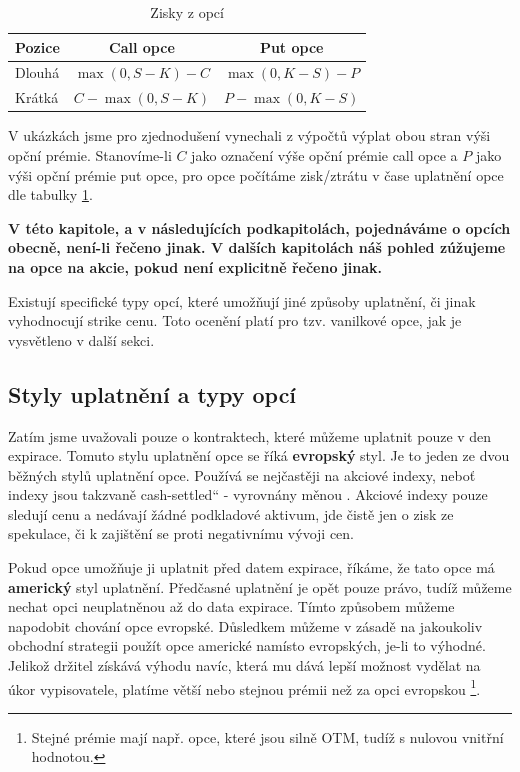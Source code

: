 \documentclass[male,czech,api_bc]{kitheses}
\newcommand{\UV}[1]{\quotedblbase#1\textquotedblleft}
\begin{document}
  \begin{table}[h]
    \centering
    \caption{Zisky z opcí}
    \label{tab:option_profits}
    \begin{tabular}{lcc}
      \toprule
      \textbf{Pozice} & \textbf{Call opce} & \textbf{Put opce} \\
      \midrule
      Dlouhá & $\max(0, S-K) - C$ & $\max(0, K-S) - P$ \\
      Krátká & $C - \max(0, S-K)$ & $P - \max(0, K-S)$ \\
      \bottomrule
    \end{tabular}
  \end{table}

  V ukázkách jsme pro zjednodušení vynechali z výpočtů výplat obou stran výši opční prémie. Stanovíme-li $C$ jako označení výše opční prémie call opce a $P$ jako výši opční prémie put opce, pro opce počítáme zisk/ztrátu v čase uplatnění opce dle tabulky \ref{tab:option_profits}.

  \textbf{V této kapitole, a v následujících podkapitolách, pojednáváme o opcích obecně, není-li řečeno jinak. V dalších kapitolách náš pohled zúžujeme na opce na akcie, pokud není explicitně řečeno jinak.}

  Existují specifické typy opcí, které umožňují jiné způsoby uplatnění, či jinak vyhodnocují strike cenu. Toto ocenění platí pro tzv. vanilkové opce, jak je vysvětleno v další sekci.

  \subsection{Styly uplatnění a typy opcí}

  \label{sec:option_types}

  Zatím jsme uvažovali pouze o kontraktech, které můžeme uplatnit pouze v den expirace. Tomuto stylu uplatnění opce se říká \textbf{evropský} styl. 
  Je to jeden ze dvou běžných stylů uplatnění opce. Používá se nejčastěji na akciové indexy, neboť indexy jsou takzvaně \UV{cash-settled} - vyrovnány měnou
  \parencites[s.~185]{McDonald2013}{Crawley2023}{Webull}.
  Akciové indexy pouze sledují cenu a nedávají žádné podkladové aktivum, jde čistě jen o zisk ze spekulace, či k zajištění se proti negativnímu vývoji cen.

  Pokud opce umožňuje ji uplatnit před datem expirace, říkáme, že tato opce má \textbf{americký} styl uplatnění. Předčasné uplatnění je opět pouze právo, tudíž můžeme nechat opci neuplatněnou až do data expirace. Tímto způsobem můžeme napodobit chování opce evropské. Důsledkem můžeme v zásadě na jakoukoliv obchodní strategii použít opce americké namísto evropských, je-li to výhodné. Jelikož držitel získává výhodu navíc, která mu dává lepší možnost vydělat na úkor vypisovatele, platíme větší nebo stejnou prémii než za opci evropskou \footnote{Stejné prémie mají např. opce, které jsou silně OTM, tudíž s nulovou vnitřní hodnotou.}.
\end{document}
